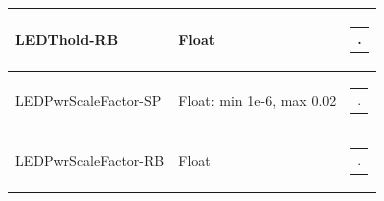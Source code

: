 \documentclass[openany]{article}
\begin{document}
\begin{longtable}{| m{4.5cm} m{2.5cm}  m{7.0cm} |}
        LEDThold-RB & Float & \begin{tabular}{@{}m{6cm}@{}}
                .
            \end{tabular} \hypertarget{pv:led-pwr-scale-factor}{}\\ \hline
        LEDPwrScaleFactor-SP & Float: min 1e-6, max 0.02 & \begin{tabular}{@{}m{6cm}@{}}
                .
            \end{tabular} \hypertarget{}{}\\ \hline
        LEDPwrScaleFactor-RB & Float & \begin{tabular}{@{}m{6cm}@{}}
                .
            \end{tabular} \hypertarget{}{}\\ \hline
    \end{longtable}
\end{document}
